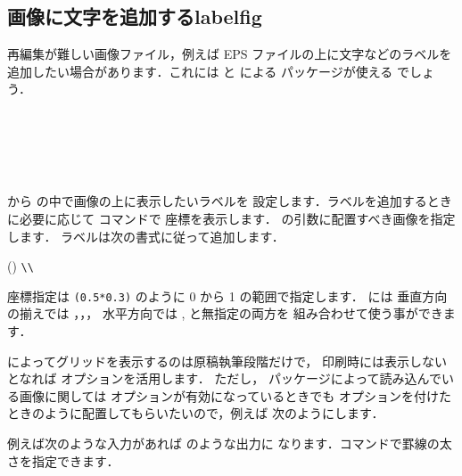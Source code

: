\subsection{画像に文字を追加する\zdash\textsf{labelfig}}

%
再編集が難しい画像ファイル，例えば EPS ファイルの上に文字などのラベルを
追加したい場合があります．これには  と
 による  パッケージが使える
でしょう．
\begin{Syntax}
 \\
\\
\\
 \\
\end{Syntax}
 から  の中で画像の上に表示したいラベルを
設定します．ラベルを追加するときに必要に応じて  コマンドで
座標を表示します． の引数に配置すべき画像を指定します．
ラベルは次の書式に従って追加します．
\begin{Syntax}
\string(\string*{}\string)  \verb|\\|
\end{Syntax}
座標指定は \verb|(0.5*0.3)| のように 0 から 1 の範囲で指定します．
には 垂直方向の揃えでは ，，，
水平方向では ,  と無指定の両方を
組み合わせて使う事ができます．

 によってグリッドを表示するのは原稿執筆段階だけで，
印刷時には表示しないとなれば  オプションを活用します．
ただし， パッケージによって読み込んでいる画像に関しては
 オプションが有効になっているときでも  
オプションを付けたときのように配置してもらいたいので，例えば
次のようにします．


例えば次のような入力があれば  のような出力に
なります．コマンドで罫線の太さを指定できます．

